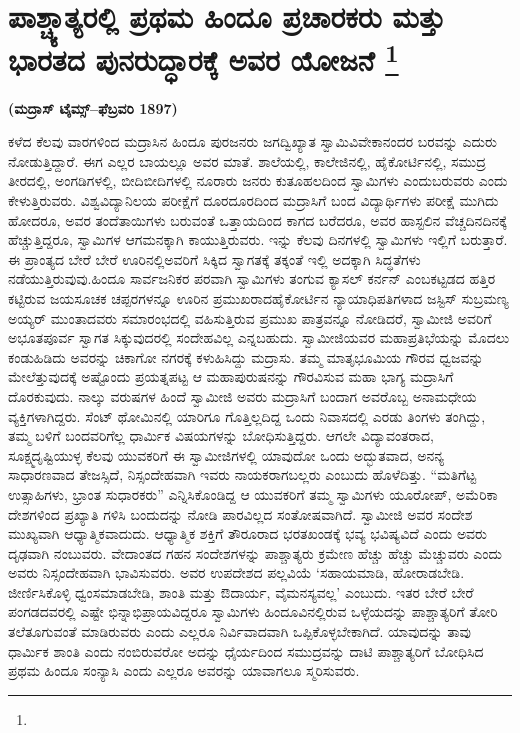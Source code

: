 
\chapter[ಪಾಶ್ಚ್ಯಾತ್ಯರಲ್ಲಿ ಪ್ರಥಮ ಹಿಂದೂ ಪ್ರಚಾರಕರು ಮತ್ತು ಭಾರತದ ಪುನರುದ್ಧಾರಕ್ಕೆ ಅವರ ಯೋಜನೆ ]{ಪಾಶ್ಚ್ಯಾತ್ಯರಲ್ಲಿ ಪ್ರಥಮ ಹಿಂದೂ ಪ್ರಚಾರಕರು ಮತ್ತು ಭಾರತದ ಪುನರುದ್ಧಾರಕ್ಕೆ ಅವರ ಯೋಜನೆ \protect\footnote{}}

\centerline{\textbf{(ಮದ್ರಾಸ್​ ಟೈಮ್ಸ್–ಫೆಬ್ರವರಿ 1897)}}

\vskip 0.4cm

ಕಳೆದ ಕೆಲವು ವಾರಗಳಿಂದ ಮದ್ರಾಸಿನ ಹಿಂದೂ ಪುರಜನರು ಜಗದ್ವಿಖ್ಯಾತ ಸ್ವಾಮಿ\break ವಿವೇಕಾನಂದರ ಬರವನ್ನು ಎದುರು ನೋಡುತ್ತಿದ್ದಾರೆ. ಈಗ ಎಲ್ಲರ ಬಾಯಲ್ಲೂ ಅವರ ಮಾತೆ. ಶಾಲೆಯಲ್ಲಿ, ಕಾಲೇಜಿನಲ್ಲಿ, ಹೈಕೋರ್ಟಿನಲ್ಲಿ, ಸಮುದ್ರ ತೀರದಲ್ಲಿ, ಅಂಗಡಿಗಳಲ್ಲಿ, ಬೀದಿಬೀದಿಗಳಲ್ಲಿ ನೂರಾರು ಜನರು ಕುತೂಹಲದಿಂದ ಸ್ವಾಮಿಗಳು ಎಂದು\break ಬರುವರು ಎಂದು ಕೇಳುತ್ತಿರುವರು. ವಿಶ್ವವಿದ್ಯಾನಿಲಯ ಪರೀಕ್ಷೆಗೆ ದೂರದೂರದಿಂದ ಮದ್ರಾಸಿಗೆ ಬಂದ ವಿದ್ಯಾರ್ಥಿಗಳು ಪರೀಕ್ಷೆ ಮುಗಿದು ಹೋದರೂ, ಅವರ ತಂದೆ\break ತಾಯಿಗಳು ಬರುವಂತೆ ಒತ್ತಾಯದಿಂದ ಕಾಗದ ಬರೆದರೂ, ಅವರ ಹಾಸ್ಟಲಿನ ವೆಚ್ಚ\break ದಿನದಿನಕ್ಕೆ ಹೆಚ್ಚುತ್ತಿದ್ದರೂ, ಸ್ವಾಮಿಗಳ ಆಗಮನಕ್ಕಾಗಿ ಕಾಯುತ್ತಿರುವರು. ಇನ್ನು ಕೆಲವು ದಿನಗಳಲ್ಲಿ ಸ್ವಾಮಿಗಳು ಇಲ್ಲಿಗೆ ಬರುತ್ತಾರೆ. ಈ ಪ್ರಾಂತ್ಯದ ಬೇರೆ ಬೇರೆ ಊರಿನಲ್ಲಿ\break ಅವರಿಗೆ ಸಿಕ್ಕಿದ ಸ್ವಾಗತಕ್ಕೆ ತಕ್ಕಂತೆ ಇಲ್ಲಿ ಅದಕ್ಕಾಗಿ ಸಿದ್ಧತೆಗಳು ನಡೆಯುತ್ತಿರುವುವು.\break ಹಿಂದೂ ಸಾರ್ವಜನಿಕರ ಪರವಾಗಿ ಸ್ವಾಮಿಗಳು ತಂಗುವ ಕ್ಯಾಸಲ್​ ಕರ್ನನ್​ ಎಂಬ\break ಕಟ್ಟಡದ ಹತ್ತಿರ ಕಟ್ಟಿರುವ ಜಯಸೂಚಕ ಚಪ್ಪರಗಳನ್ನೂ ಊರಿನ ಪ್ರಮುಖರಾದ\break ಹೈಕೋರ್ಟಿನ ನ್ಯಾಯಾಧಿಪತಿಗಳಾದ ಜಸ್ಟಿಸ್​ ಸುಬ್ರಮಣ್ಯ ಅಯ್ಯರ್​ ಮುಂತಾದವರು ಸಮಾರಂಭದಲ್ಲಿ ವಹಿಸುತ್ತಿರುವ ಪ್ರಮುಖ ಪಾತ್ರವನ್ನೂ ನೋಡಿದರೆ, ಸ್ವಾಮೀಜಿ ಅವರಿಗೆ ಅಭೂತಪೂರ್ವ ಸ್ವಾಗತ ಸಿಕ್ಕುವುದರಲ್ಲಿ ಸಂದೇಹವಿಲ್ಲ ಎನ್ನಬಹುದು. ಸ್ವಾಮೀಜಿಯವರ ಮಹಾಪ್ರತಿಭೆಯನ್ನು ಮೊದಲು ಕಂಡುಹಿಡಿದು ಅವರನ್ನು ಚಿಕಾಗೋ ನಗರಕ್ಕೆ ಕಳುಹಿಸಿದ್ದು ಮದ್ರಾಸು. ತಮ್ಮ ಮಾತೃಭೂಮಿಯ ಗೌರವ ಧ್ವಜವನ್ನು ಮೇಲೆತ್ತುವುದಕ್ಕೆ ಅಷ್ಟೊಂದು ಪ್ರಯತ್ನಪಟ್ಟ ಆ ಮಹಾಪುರುಷನನ್ನು ಗೌರವಿಸುವ ಮಹಾ ಭಾಗ್ಯ ಮದ್ರಾಸಿಗೆ ದೊರಕುವುದು. ನಾಲ್ಕು ವರುಷಗಳ ಹಿಂದೆ ಸ್ವಾಮೀಜಿ ಅವರು ಮದ್ರಾಸಿಗೆ ಬಂದಾಗ ಅವರೊಬ್ಬ ಅನಾಮಧೇಯ ವ್ಯಕ್ತಿಗಳಾಗಿದ್ದರು. ಸೆಂಟ್​ ಥೋಮಿನಲ್ಲಿ ಯಾರಿಗೂ ಗೊತ್ತಿಲ್ಲದಿದ್ದ ಒಂದು ನಿವಾಸದಲ್ಲಿ ಎರಡು ತಿಂಗಳು ತಂಗಿದ್ದು, ತಮ್ಮ ಬಳಿಗೆ ಬಂದವರಿಗೆಲ್ಲ ಧಾರ್ಮಿಕ ವಿಷಯಗಳನ್ನು ಬೋಧಿಸುತ್ತಿದ್ದರು. ಆಗಲೇ ವಿದ್ಯಾವಂತರಾದ, ಸೂಕ್ಷ್ಮದೃಷ್ಟಿಯುಳ್ಳ ಕೆಲವು ಯುವಕರಿಗೆ ಈ ಸ್ವಾಮೀಜಿಗಳಲ್ಲಿ ಯಾವುದೋ ಒಂದು ಅದ್ಭುತವಾದ, ಅನನ್ಯ ಸಾಧಾರಣವಾದ ತೇಜಸ್ಸಿದೆ, ನಿಸ್ಸಂದೇಹವಾಗಿ ಇವರು ನಾಯಕರಾಗಬಲ್ಲರು ಎಂಬುದು ಹೊಳೆದಿತ್ತು. “ಮತಿಗೆಟ್ಟ ಉತ್ಸಾಹಿಗಳು, ಭ್ರಾಂತ ಸುಧಾರಕರು” ಎನ್ನಿಸಿಕೊಂಡಿದ್ದ ಆ ಯುವಕರಿಗೆ ತಮ್ಮ ಸ್ವಾಮಿಗಳು ಯೂರೋಪ್​, ಅಮೆರಿಕಾ ದೇಶಗಳಿಂದ ಪ್ರಖ್ಯಾತಿ ಗಳಿಸಿ ಬಂದುದನ್ನು ನೋಡಿ ಪಾರವಿಲ್ಲದ ಸಂತೋಷವಾಗಿದೆ. ಸ್ವಾಮೀಜಿ ಅವರ ಸಂದೇಶ ಮುಖ್ಯವಾಗಿ ಆಧ್ಯಾತ್ಮಿಕವಾದುದು. ಆಧ್ಯಾತ್ಮಿಕ ಶಕ್ತಿಗೆ ತೌರೂರಾದ ಭರತಖಂಡಕ್ಕೆ ಭವ್ಯ ಭವಿಷ್ಯವಿದೆ ಎಂದು ಅವರು ದೃಢವಾಗಿ ನಂಬುವರು. ವೇದಾಂತದ ಗಹನ ಸಂದೇಶಗಳನ್ನು ಪಾಶ್ಚಾತ್ಯರು ಕ್ರಮೇಣ ಹೆಚ್ಚು ಹೆಚ್ಚು ಮೆಚ್ಚುವರು ಎಂದು ಅವರು ನಿಸ್ಸಂದೇಹವಾಗಿ ಭಾವಿಸುವರು. ಅವರ ಉಪದೇಶದ ಪಲ್ಲವಿಯೆ ‘ಸಹಾಯಮಾಡಿ, ಹೋರಾಡಬೇಡಿ. ಜೀರ್ಣಿಸಿಕೊಳ್ಳಿ ಧ್ವಂಸಮಾಡಬೇಡಿ, ಶಾಂತಿ ಮತ್ತು ಔದಾರ್ಯ, ವೈಮನಸ್ಯವಲ್ಲ’ ಎಂಬುದು. ಇತರ ಬೇರೆ ಬೇರೆ ಪಂಗಡದವರಲ್ಲಿ ಎಷ್ಟೇ ಭಿನ್ನಾಭಿಪ್ರಾಯವಿದ್ದರೂ ಸ್ವಾಮಿಗಳು ಹಿಂದೂವಿನಲ್ಲಿರುವ ಒಳ್ಳೆಯದನ್ನು ಪಾಶ್ಚಾತ್ಯರಿಗೆ ತೋರಿ ತಲೆತೂಗುವಂತೆ ಮಾಡಿರುವರು ಎಂದು ಎಲ್ಲರೂ ನಿರ್ವಿವಾದವಾಗಿ ಒಪ್ಪಿಕೊಳ್ಳಬೇಕಾಗಿದೆ. ಯಾವುದನ್ನು ತಾವು ಧಾರ್ಮಿಕ ಶಾಂತಿ ಎಂದು ನಂಬಿರುವರೋ ಅದನ್ನು ಧೈರ್ಯದಿಂದ ಸಮುದ್ರವನ್ನು ದಾಟಿ ಪಾಶ್ಚಾತ್ಯರಿಗೆ ಬೋಧಿಸಿದ ಪ್ರಥಮ ಹಿಂದೂ ಸಂನ್ಯಾಸಿ ಎಂದು ಎಲ್ಲರೂ ಅವರನ್ನು ಯಾವಾಗಲೂ ಸ್ಮರಿಸುವರು.


